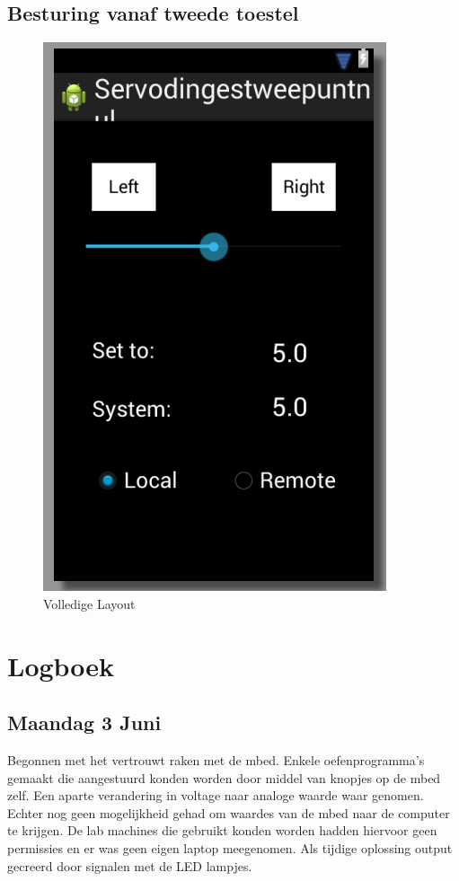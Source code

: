 \documentclass[a4paper]{article}
\begin{document}
		\subsection{Besturing vanaf tweede toestel}
	\begin{figure}[h]
		\centering
		\includegraphics[scale=0.6]{imgs/layout3.png}
		\caption{Volledige Layout}
		\label{fig:layout3}
	\end{figure}
	\newpage
	\section{Logboek}
		\subsection{Maandag 3 Juni}
			Begonnen met het vertrouwt raken met de mbed. Enkele oefenprogramma's gemaakt die aangestuurd konden worden door middel van knopjes op de mbed zelf. Een aparte verandering in voltage naar analoge waarde waar genomen. Echter nog geen mogelijkheid gehad om waardes van de mbed naar de computer te krijgen. De lab machines die gebruikt konden worden hadden hiervoor geen permissies en er was geen eigen laptop meegenomen. Als tijdige oplossing output gecreerd door signalen met de LED lampjes.
\end{document}
